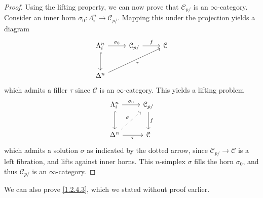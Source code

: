 \begin{proof}
	Using the lifting property, we can now prove that $\mathcal{C} _{p/} $ is an $\infty $-category. Consider an inner horn $\sigma _0 : \Lambda _i^n \to \mathcal{C} _{p/} $. Mapping this under the projection yields a diagram
	\[\begin{tikzcd}[row sep = 2.5em, column sep = 2.5em]
	\Lambda_i^n \ar[" \sigma _0 ", r]  \ar[hook, d]& \mathcal{C} _{p/} \ar[" f ", r]   & \mathcal{C}  \\
	\Delta ^n \ar[" \tau  "', urr]  &  & 
	\end{tikzcd}\]
	which admits a filler $\tau $ since $\mathcal{C} $ is an $\infty $-category. This yields a lifting problem
	\[\begin{tikzcd}[row sep = 2.5em, column sep = 2.5em]
	\Lambda_i^n \ar[" \sigma _0 ", r] \ar[hook, d]  & \mathcal{C}_{p/} \ar[" f ", d]  \\
	\Delta ^n \ar[" \tau  "', r] \ar[dotted, " \sigma  ", ur]  & \mathcal{C}
	\end{tikzcd}\]
	which admits a solution $\sigma $ as indicated by the dotted arrow, since $\mathcal{C} _{p/} \to \mathcal{C} $ is a left fibration, and lifts against inner horns. This $n$-simplex $\sigma $ fills the horn $\sigma _0$, and thus $\mathcal{C} _{p/} $ is an $\infty $-category.
\end{proof}

We can also prove \cref{1.2.4.3}, which we stated without proof earlier.

